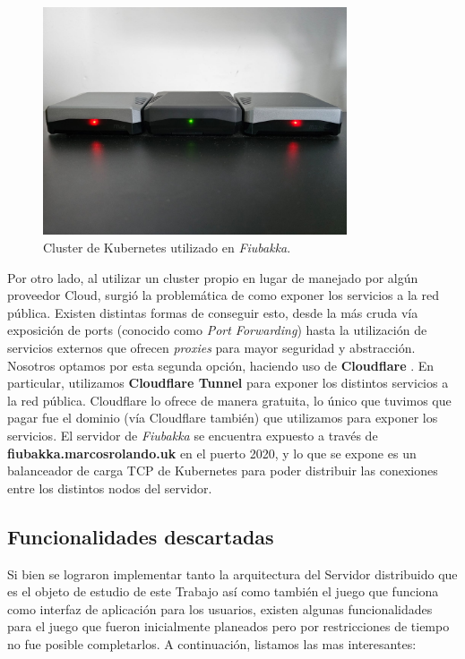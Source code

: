 \begin{figure}[htbp]
    \centering
    \includegraphics[width=0.8\textwidth]{../assets/fiubakka-cluster-pis.png}
    \caption{Cluster de Kubernetes utilizado en \textit{Fiubakka}.}
\end{figure}

Por otro lado, al utilizar un cluster propio en lugar de manejado por algún proveedor Cloud, surgió la problemática de como exponer los servicios a la red pública. Existen distintas formas de conseguir esto, desde la más cruda vía
exposición de ports (conocido como \textit{Port Forwarding}) hasta la utilización de servicios externos que ofrecen \textit{proxies} para mayor seguridad y abstracción. Nosotros optamos por esta segunda opción, haciendo uso de
\textbf{Cloudflare} \label{ref:cloudflare}. En particular, utilizamos \textbf{Cloudflare Tunnel} para exponer los distintos servicios a la red pública. Cloudflare lo ofrece de manera gratuita, lo único que tuvimos que pagar fue el dominio (vía Cloudflare
también) que utilizamos para exponer los servicios. El servidor de \textit{Fiubakka} se encuentra expuesto a través de \textbf{fiubakka.marcosrolando.uk} en el puerto 2020, y lo que se expone es un balanceador de carga TCP de Kubernetes
para poder distribuir las conexiones entre los distintos nodos del servidor.

\subsection{Funcionalidades descartadas}

Si bien se lograron implementar tanto la arquitectura del Servidor distribuido que es el objeto
de estudio de este Trabajo así como también el juego que funciona como interfaz de aplicación
para los usuarios, existen algunas funcionalidades para el juego que fueron inicialmente
planeados pero por restricciones de tiempo no fue posible completarlos. A continuación, listamos 
las mas interesantes:

